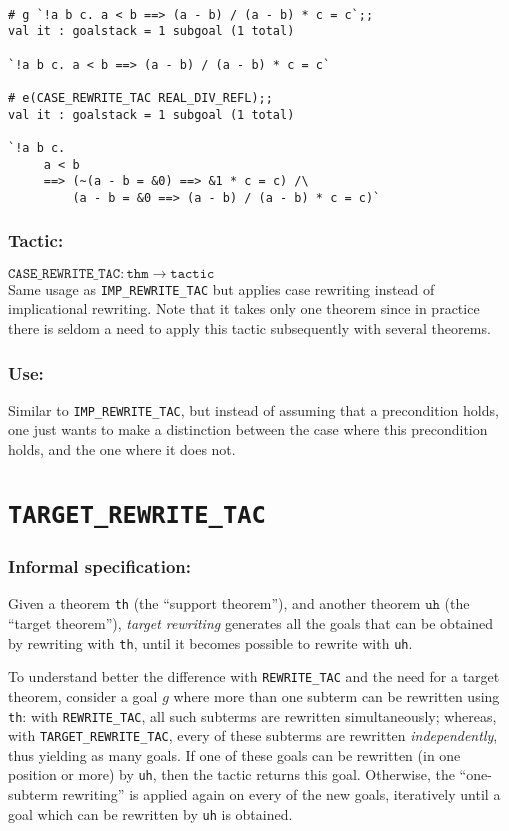 \documentclass{llncs}
\newcommand*\IMPREWRITETAC{\texttt{IMP\_REWRITE\_TAC}\xspace}
\newcommand*\REWRITETAC{\texttt{REWRITE\_TAC}\xspace}
\newcommand*\TARGETTAC{\texttt{TARGET\_REWRITE\_TAC}\xspace}
\newcommand*\CASETAC{\texttt{CASE\_REWRITE\_TAC}\xspace}
\begin{document}
    \begin{example}
    \begin{verbatim}

# g `!a b c. a < b ==> (a - b) / (a - b) * c = c`;;
val it : goalstack = 1 subgoal (1 total)

`!a b c. a < b ==> (a - b) / (a - b) * c = c`

# e(CASE_REWRITE_TAC REAL_DIV_REFL);;
val it : goalstack = 1 subgoal (1 total)

`!a b c.
     a < b
     ==> (~(a - b = &0) ==> &1 * c = c) /\
         (a - b = &0 ==> (a - b) / (a - b) * c = c)` \end{verbatim}
    \end{example}

		\subsubsection{Tactic:}
		$\mathtt{\CASETAC: thm \to tactic}$\\
    Same usage as \IMPREWRITETAC but applies case rewriting instead of implicational rewriting.
    Note that it takes only one theorem since in practice there is
    seldom a need to apply this tactic subsequently with several theorems.

    \subsubsection{Use:} Similar to \IMPREWRITETAC, but instead of assuming that a precondition holds,
    one just wants to make a distinction between the case where this precondition holds, and the one where it
    does not.

    \newpage
  \section{\TARGETTAC}
		\subsubsection{Informal specification:}
    Given a theorem \texttt{th} (the ``support theorem''),
    and another theorem $\mathtt{uh}$ (the ``target theorem''),
    \emph{target rewriting} generates all the goals that can be obtained by rewriting
    with \texttt{th}, until it becomes possible to rewrite with \texttt{uh}.

    To understand better the difference with \REWRITETAC and the need for a target theorem,
    consider a goal $g$ where more than one subterm can be rewritten using \texttt{th}:
    with \REWRITETAC, all such subterms are rewritten simultaneously; whereas, with \TARGETTAC,
    every of these subterms are rewritten \emph{independently}, thus yielding as many goals.
    If one of these goals can be rewritten (in one position or more) by \texttt{uh}, then
    the tactic returns this goal.
    Otherwise, the ``one-subterm rewriting'' is applied again on every of the new goals,
    iteratively until a goal which can be rewritten by \texttt{uh} is obtained.
\end{document}
